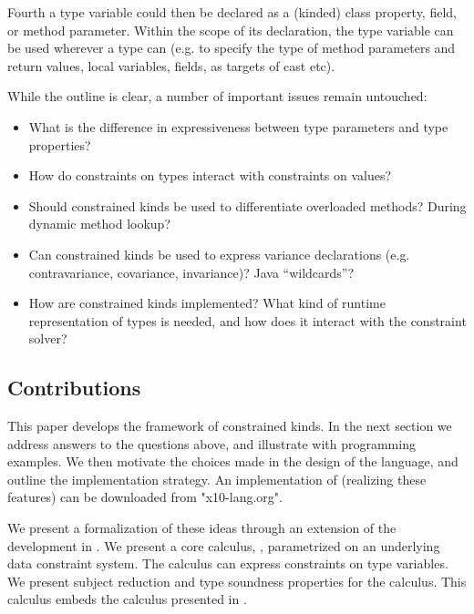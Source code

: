 Fourth a type variable could then be declared as a (kinded) class
property, field, or method parameter. Within the scope of its
declaration, the type variable can be used wherever a type can (e.g.{}
to specify the type of method parameters and return values, local
variables, fields, as targets of cast etc).

While the outline is clear, a number of important issues remain untouched:
\begin{itemize}
\item What is the difference in expressiveness between type parameters and type properties? 

\item How do constraints on types interact with constraints on values?

\item Should constrained kinds be used to differentiate overloaded methods? During dynamic method lookup?

\item Can constrained kinds be used to express variance declarations (e.g.{} contravariance, covariance, invariance)? Java ``wildcards''?

\item How are constrained kinds implemented? What kind of runtime representation of types is needed, and how does it interact with the constraint solver?
\end{itemize}

\subsection{Contributions}

This paper develops the framework of constrained kinds. In the next
section we address answers to the questions above, and illustrate with
programming examples. We then motivate the choices made in the design
of the \Xten{} language, and outline the implementation strategy. An
implementation of \Xten{} (realizing these features) can be downloaded
from \xcd"x10-lang.org". 

We present a formalization of these ideas through an extension of the
development in \cite{constrained-types}. We present a core calculus,
\FXG{}, parametrized on an underlying data constraint system. The
calculus can express  constraints on type variables. We
present subject reduction and type soundness properties for the
calculus. This calculus embeds the calculus presented in
\cite{constrained-types}. 

